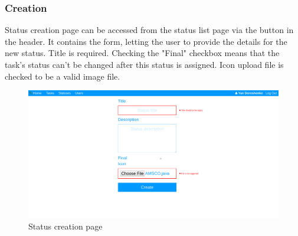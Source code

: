 \documentclass{article}
\begin{document}
\subsubsection{Creation}
Status creation page can be accessed from the status list page via the button in the header. It contains the form, letting the user to provide the details for the new status. Title is required. Checking the "Final" checkbox means that the task's status can't be changed after this status is assigned. Icon upload file is checked to be a valid image file.
\begin{figure}[H]
    \includegraphics[width=\textwidth]{img/createstatus.png}
    \caption{Status creation page}
\end{figure}
\end{document}
